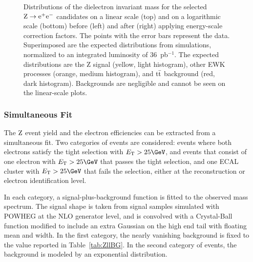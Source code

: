 \begin{figure}
\begin{center}
   \caption{ \label{fig:Zee}
Distributions of the dielectron invariant mass for the selected $\mathrm{Z} \rightarrow \mathrm{e}^+\mathrm{e}^-$ candidates on
a linear scale (top) and on a logarithmic scale (bottom) before (left)
and after (right) applying energy-scale correction factors.
The points with the error bars represent the data.
Superimposed are the expected distributions from simulations, normalized
to an integrated luminosity of $36$~pb$^{-1}$. The expected distributions are
the Z signal (yellow, light histogram), other EWK processes (orange, medium histogram),
and $\mathrm{t}\bar{\mathrm{t}}$ background (red, dark histogram).
Backgrounds are negligible and cannot be seen on the linear-scale plots.
}
  \end{center}
\end{figure}


\subsubsection{Simultaneous Fit}

The $\mathrm{Z}$ event yield and the electron efficiencies can be extracted from
a simultaneous fit. Two categories of events are
considered: events where both electrons satisfy
the tight selection with $\Et>25\GeV$, and events that consist of
one electron with $\Et>25\GeV$ that passes the tight selection, and one
ECAL cluster with $\Et>25\GeV$ that fails
the selection, either at the reconstruction or electron identification level.

In each category, a signal-plus-background function is fitted to the observed mass spectrum.
The signal shape is taken from signal samples simulated with POWHEG at the NLO generator level,
and is convolved with a Crystal-Ball function modified to include an extra
Gaussian on the high end tail with floating mean and width.
In the first category, the nearly vanishing background is fixed to the
value reported in Table~\ref{tab:ZllBG}. In the second
category of events, the background is modeled by an exponential distribution.

